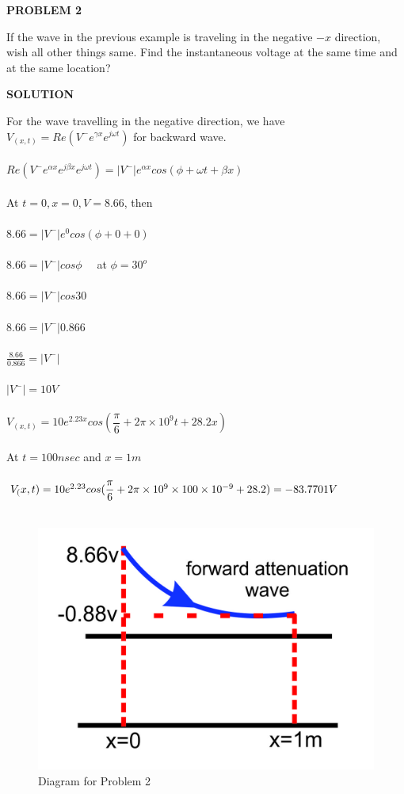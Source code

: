 \begin{center}
\textbf{PROBLEM 2}
\end{center}
If the wave in the previous example is traveling in the negative ${-x}$ direction, wish all other things same. Find the instantaneous  voltage at the same time and at the same location?\\
\begin{center}
\textbf{SOLUTION}
\end{center}
For the wave travelling in the negative direction, we have\\
$V_{(x,t)} = Re(V^{-}e^{\gamma x}e^{j\omega t})$ for backward wave.\\\\
$Re({V^{-}e^{\alpha x}e^{j\beta x}e^{j\omega t}}) = {|V^{-}|e^{\alpha x}cos{(\phi+\omega t + \beta x)}}$\\\\
At ${t=0, x=0, V=8.66}$, then\\\\
${8.66} = {|V^{-}|}e^{0} cos({\phi + 0 + 0})$\\\\
$8.66 = {|V^-|{cos\phi}} \quad$ at $ \phi = 30^{o} $\\\\
$8.66 = {|V^-|{cos30}}$\\\\
$8.66 = {|V^-|{0.866}}$\\\\
$\frac{8.66}{0.866} = {|V^-|}$\\\\
${|V^{-}|} = 10V$\\\\
$V_({x,t}) = 10e^{2.23x} cos({\dfrac{\pi}{6} + 2\pi\times10^9t + 28.2x})$\\\\
At ${t=100nsec}$ and ${x=1m}$\\\\
$V_({x,t}) = 10e^{2.23} cos({\dfrac{\pi}{6} + 2\pi\times10^9\times100\times10^{-9} + 28.2})\\\\
= -83.7701V$\\\\
\begin{figure}[h!]
\centering
\includegraphics[scale=0.5]{./graphics/Group98}
\caption{Diagram for Problem 2}
\end{figure}
